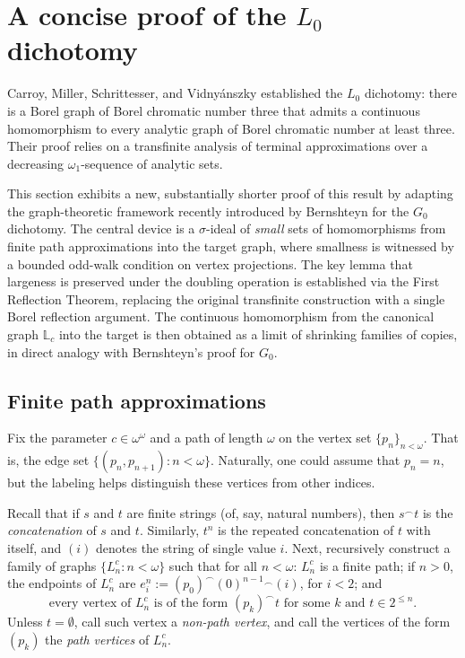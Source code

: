
\section{A concise proof of the \texorpdfstring{$L_0$}{L0} dichotomy}\label{sec:concise_L0}

Carroy, Miller, Schrittesser, and Vidny\'anszky established the $L_0$ dichotomy: there is a Borel graph of Borel chromatic number three that admits a continuous homomorphism to every analytic graph of Borel chromatic number at least three.
Their proof relies on a transfinite analysis of terminal approximations over a decreasing $\omega_1$-sequence of analytic sets.

This section exhibits a new, substantially shorter proof of this result by adapting the graph-theoretic framework recently introduced by Bernshteyn for the $G_0$ dichotomy.
The central device is a $\sigma$-ideal of \emph{small} sets of homomorphisms from finite path approximations into the target graph, where smallness is witnessed by a bounded odd-walk condition on vertex projections.
The key lemma that largeness is preserved under the doubling operation is established via the First Reflection Theorem, replacing the original transfinite construction with a single Borel reflection argument.
The continuous homomorphism from the canonical graph $\mathbb L_c$ into the target is then obtained as a limit of shrinking families of copies, in direct analogy with Bernshteyn's proof for $G_0$.

\subsection{Finite path approximations}\label{sec:finite-path-approx}

Fix the parameter $c\in\omega^\omega$ and a path of length $\omega$ on the vertex set $\{p_n\}_{n<\omega}$.
That is, the edge set $\{(p_n,p_{n+1}):n<\omega\}$.
Naturally, one could assume that $p_n=n$, but the labeling helps distinguish these vertices from other indices.

Recall that if $s$ and $t$ are finite strings (of, say, natural numbers), then $s^\frown t$ is the \emph{concatenation} of $s$ and $t$.
Similarly, $t^n$ is the repeated concatenation of $t$ with itself, and $(i)$ denotes the string of single value $i$.
Next, recursively construct a family of graphs $\{L^c_n:n<\omega\}$ such that for all $n<\omega$:
$L^c_n$ is a finite path; if $n>0$, the endpoints of $L^c_n$ are $e_i^n:=(p_0)^\smallfrown(0)^{n-1}{}^\smallfrown(i)$, for $i<2$; and
\begin{equation}
\text{every vertex of }L^c_n\text{ is of the form }(p_k)^\smallfrown t\text{ for some }k\text{ and }t\in2^{\leq n}.\label{eq:L_n-condition-iii}\end{equation}
Unless $t=\emptyset$, call such vertex a \emph{non-path vertex}, and call the vertices of the form $(p_k)$ the \emph{path vertices} of $L^c_n$.

